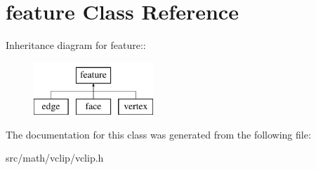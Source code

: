 \hypertarget{classfeature}{
\section{feature Class Reference}
\label{classfeature}
}
Inheritance diagram for feature::\begin{figure}[H]
\begin{center}
\leavevmode
\includegraphics[height=2cm]{classfeature}
\end{center}
\end{figure}


The documentation for this class was generated from the following file:\begin{DoxyCompactItemize}
\item 
src/math/vclip/vclip.h\end{DoxyCompactItemize}
